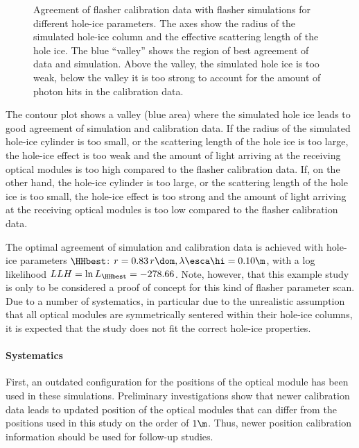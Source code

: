 \begin{figure}[htbp]
  \caption{Agreement of flasher calibration data with flasher simulations for different hole-ice parameters. The axes show the radius of the simulated hole-ice column and the effective scattering length of the hole ice. The blue ``valley'' shows the region of best agreement of data and simulation. Above the valley, the simulated hole ice is too weak, below the valley it is too strong to account for the amount of photon hits in the calibration data.}
  \label{fig:ut4nao7X}
\end{figure}

The contour plot shows a valley (blue area) where the simulated hole ice leads to good agreement of simulation and calibration data.
If the radius of the simulated hole-ice cylinder is too small, or the scattering length of the hole ice is too large, the hole-ice effect is too weak and the amount of light arriving at the receiving optical modules is too high compared to the flasher calibration data.
If, on the other hand, the hole-ice cylinder is too large, or the scattering length of the hole ice is too small, the hole-ice effect is too strong and the amount of light arriving at the receiving optical modules is too low compared to the flasher calibration data.

The optimal agreement of simulation and calibration data is achieved with hole-ice parameters $\HHbest$: $r = 0.83\,r\dom, \lambda\esca\hi = 0.10\m$, with a log likelihood $LLH = \ln L_\HHbest = -278.66$. Note, however, that this example study is only to be considered a proof of concept for this kind of flasher parameter scan. Due to a number of systematics, in particular due to the unrealistic assumption that all optical modules are symmetrically sentered within their hole-ice columns, it is expected that the study does not fit the correct hole-ice properties.

\paragraph{Systematics}
First, an outdated configuration for the positions of the optical module has been used in these simulations. Preliminary investigations show that newer calibration data leads to updated position of the optical modules that can differ from the positions used in this study on the order of $1\m$. Thus, newer position calibration information should be used for follow-up studies.

